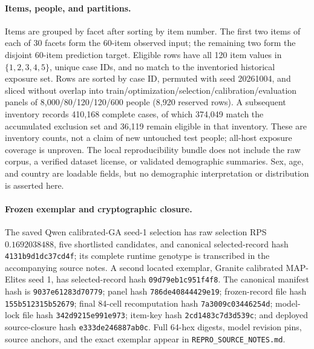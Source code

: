 \paragraph{Items, people, and partitions.}
Items are grouped by facet after sorting by item number.  The first two items
of each of 30 facets form the 60-item observed input; the remaining two form
the disjoint 60-item prediction target.  Eligible rows have all 120 item values
in $\{1,2,3,4,5\}$, unique case IDs, and no match to the inventoried historical
exposure set.  Rows are sorted by case ID, permuted with seed 20261004, and
sliced without overlap into train/optimization/selection/calibration/evaluation
panels of 8,000/80/120/120/600 people (8,920 reserved rows).  A subsequent inventory records 410,168 complete cases, of which 374,049
match the accumulated exclusion set and 36,119 remain eligible in that
inventory. These are inventory counts, not a claim of new untouched test
people; all-host exposure coverage is unproven. The local reproducibility
bundle does not include the raw corpus, a verified dataset license, or
validated demographic summaries.  Sex, age, and
country are loadable fields, but no demographic interpretation or distribution
is asserted here.

\paragraph{Frozen exemplar and cryptographic closure.}
The saved Qwen calibrated-GA seed-1 selection has raw selection RPS
$0.1692038488$, five shortlisted candidates, and canonical selected-record hash
\texttt{4131b9d1dc37cd4f}; its complete runtime genotype is transcribed in the
accompanying source notes.  A second located exemplar, Granite calibrated
MAP-Elites seed 1, has selected-record hash \texttt{09d79eb1c951f4f8}.
The canonical manifest hash is \texttt{9037e61283d70779}; panel hash
\texttt{786de40844429e19}; frozen-record file hash \texttt{155b512315b52679};
final 84-cell recomputation hash \texttt{7a3009c03446254d}; model-lock file hash
\texttt{342d9215e991e973}; item-key hash \texttt{2cd1483c7d3d539c}; and deployed
source-closure hash \texttt{e333de246887ab0c}.  Full 64-hex digests, model
revision pins, source anchors, and the exact exemplar appear in
\texttt{REPRO\_SOURCE\_NOTES.md}.

